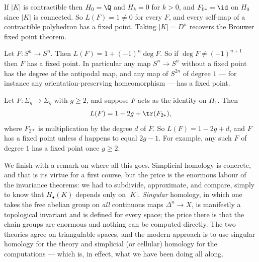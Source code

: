 \begin{example}
	If $|K|$ is contractible then $H_0 = \Q$ and $H_k = 0$ for $k > 0$, and $F_{0*} = \id$ on $H_0$ since $|K|$ is connected. So $L(F) = 1 \neq 0$ for every $F$, and every self-map of a contractible polyhedron has a fixed point. Taking $|K| = D^n$ recovers the Brouwer fixed point theorem.
\end{example}

\begin{example}
	Let $F: S^n \to S^n$. Then $L(F) = 1 + (-1)^n\deg F$. So if $\deg F \neq (-1)^{n+1}$ then $F$ has a fixed point. In particular any map $S^n \to S^n$ without a fixed point has the degree of the antipodal map, and any map of $S^{2n}$ of degree $1$ --- for instance any orientation-preserving homeomorphism --- has a fixed point.
\end{example}

\begin{example}
	Let $F: \Sigma_g \to \Sigma_g$ with $g \geq 2$, and suppose $F$ acts as the identity on $H_1$. Then
	$$
	L(F) = 1 - 2g + \tr(F_{2*}),
	$$
	where $F_{2*}$ is multiplication by the degree $d$ of $F$. So $L(F) = 1-2g+d$, and $F$ has a fixed point unless $d$ happens to equal $2g-1$. For example, any such $F$ of degree $1$ has a fixed point once $g \geq 2$.
\end{example}

We finish with a remark on where all this goes. Simplicial homology is concrete, and that
is its virtue for a first course, but the price is the enormous labour of the invariance
theorems: we had to subdivide, approximate, and compare, simply to know that
$H_\bullet(K)$ depends only on $|K|$. \emph{Singular} homology, in which one takes the
free abelian group on \emph{all} continuous maps $\Delta^n \to X$, is manifestly a
topological invariant and is defined for every space; the price there is that the chain
groups are enormous and nothing can be computed directly. The two theories agree on
triangulable spaces, and the modern approach is to use singular homology for the theory
and simplicial (or cellular) homology for the computations --- which is, in effect, what
we have been doing all along.

